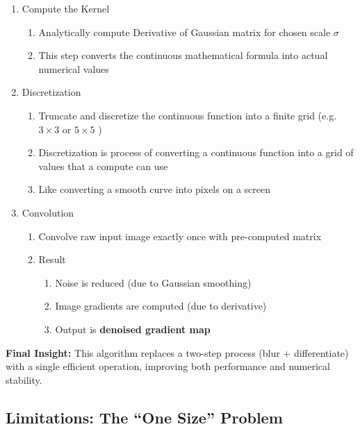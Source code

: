 \documentclass[12pt]{article}
\begin{document}
\begin{enumerate}
    \item Compute the Kernel
          \begin{enumerate}
              \item Analytically compute Derivative of Gaussian matrix for chosen scale $\sigma$
              \item This step converts the continuous mathematical formula into actual numerical values
          \end{enumerate}
    \item Discretization
          \begin{enumerate}
              \item Truncate and discretize the continuous function into a finite grid (e.g. $3 \times 3$ or $5 \times 5$ )
              \item Discretization is process of converting a continuous function into a grid of values that a compute can use
              \item Like converting a smooth curve into pixels on a screen
          \end{enumerate}
    \item Convolution
          \begin{enumerate}
              \item Convolve raw input image exactly once with pre-computed matrix
              \item Result
                    \begin{enumerate}
                        \item Noise is reduced (due to Gaussian smoothing)
                        \item Image gradients are computed (due to derivative)
                        \item Output is \textbf{denoised gradient map}
                    \end{enumerate}
          \end{enumerate}
\end{enumerate}

\textbf{Final Insight:}
This algorithm replaces a two-step process (blur + differentiate) with a single efficient operation, improving both performance and numerical stability.

\subsection{Limitations: The ``One Size'' Problem}
\end{document}
